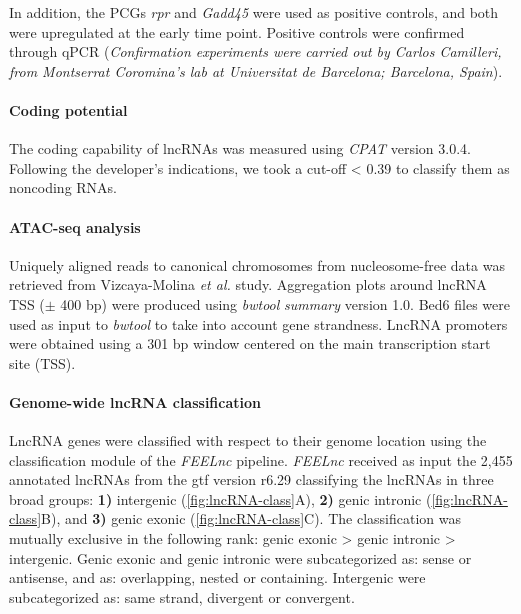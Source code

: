 In addition, the PCGs \textit{rpr} and \textit{Gadd45}  were used as positive controls, and both were upregulated at the early time point. Positive controls were confirmed through qPCR (\textit{Confirmation experiments were carried out by Carlos Camilleri, from Montserrat Coromina’s lab at Universitat de Barcelona; Barcelona, Spain}).

\paragraph{Coding potential}
\label{sec:coding_potential}

The coding capability of lncRNAs was measured using \textit{CPAT}  \autocite{wang_2013_cpat} version 3.0.4. Following the developer’s indications, we took a cut-off < 0.39 to classify them as noncoding RNAs.

\paragraph{ATAC-seq analysis}
\label{sec:atac-seq-methods}

Uniquely aligned reads to canonical chromosomes from nucleosome-free data was retrieved from Vizcaya-Molina \textit{et al.}\autocite{vizcaya_2018} study. Aggregation plots around lncRNA TSS ($\pm$ 400 bp) were produced using \textit{bwtool}\autocite{pohl_bwtool} \textit{summary} version 1.0. Bed6 files were used as input to \textit{bwtool} to take into account gene strandness. LncRNA promoters were obtained using a 301 bp window centered on the main transcription start site (TSS).\autocite{batut_2017}

\paragraph{Genome-wide lncRNA classification}
\label{sec:lncRNA_classification}

LncRNA genes were classified with respect to their genome location using the classification module of the \textit{FEELnc}\autocite{wucher_2017} pipeline. \textit{FEELnc} received as input the 2,455 annotated lncRNAs from the gtf version r6.29 classifying the lncRNAs in three broad groups: \textbf{1)} intergenic (\autoref{fig:lncRNA-class}A), \textbf{2)} genic intronic (\autoref{fig:lncRNA-class}B), and \textbf{3)} genic exonic (\autoref{fig:lncRNA-class}C). The classification was mutually exclusive in the following rank: genic exonic > genic intronic > intergenic. Genic exonic and genic intronic were subcategorized as: sense or antisense, and as: overlapping, nested or containing. Intergenic were subcategorized as: same strand, divergent or convergent.

